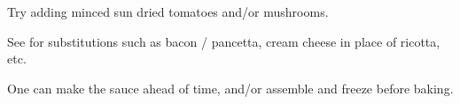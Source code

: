 \begin{variation}
\item Try adding minced sun dried tomatoes and/or mushrooms.

\item See  \cite{newCookBook2014} for substitutions such as bacon / pancetta, cream cheese in place of ricotta, etc.

\item One can make the sauce ahead of time, and/or assemble and freeze before baking.
\end{variation}


\recipeend
